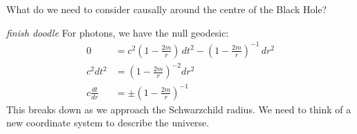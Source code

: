 \documentclass[a4paper, 11pt, normalem]{report}
\begin{document}
What do we need to consider causally around the centre of the Black Hole?
\begin{figure}[H]
    \centering
\end{figure}
\emph{finish doodle}
For photons, we have the null geodesic:
\begin{align}
    0 &= c^2\left(1-\frac{2m}{r}\right)\,dt^2 - \left(1-\frac{2m}{r}\right)^{-1}\,dr^2 \\
    c^2dt^2 &= \left(1-\frac{2m}{r}\right)^{-2}dr^2 \\
    c\frac{dt}{dr} &= \pm \left(1-\frac{2m}{r}\right)^{-1}
\end{align}
This breaks down as we approach the Schwarzchild radius.
We need to think of a new coordinate system to describe the universe.
\end{document}
